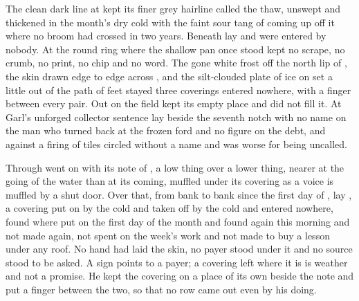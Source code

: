 The clean dark line at  kept its finer grey hairline called the thaw, unswept and thickened in the month's dry cold with the faint sour tang of  coming up off it where no broom had crossed in two years. Beneath   lay and were entered by nobody. At  the round ring where the shallow pan once stood kept no scrape, no crumb, no print, no chip and no word. The gone white frost off the north lip of , the skin drawn edge to edge across , and the silt-clouded plate of ice on  set a little out of the path of feet stayed three coverings entered nowhere, with a finger between every pair. Out on  the field kept its empty place and did not fill it. At  Garl's unforged collector sentence lay beside the seventh notch with no name on the man who turned back at the frozen ford and no figure on the debt, and  against a firing of tiles circled without a name and was worse for being uncalled.

Through   went on with its note of , a low thing over a lower thing, nearer at the going of the water than at its coming, muffled under its covering as a voice is muffled by a shut door. Over that, from bank to bank since the first day of , lay , a covering put on by the cold and taken off by the cold and entered nowhere, found where put on the first day of the month and found again this morning and not made again, not spent on the week's work and not made to buy a lesson under any roof. No hand had laid the skin, no payer stood under it and no source stood to be asked. A sign points to a payer; a covering left where it is is weather and not a promise. He kept the covering on a place of its own beside the note and put a finger between the two, so that no row came out even by his doing.

\scenebreak


